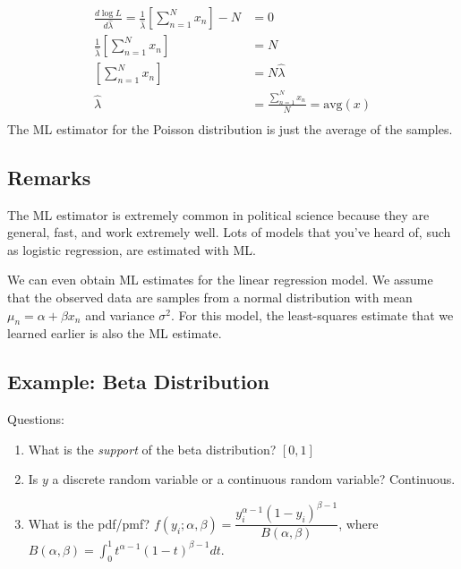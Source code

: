 \documentclass[
]{book}
\providecommand{\tightlist}{%
  \setlength{\itemsep}{0pt}\setlength{\parskip}{0pt}}
\begin{document}
\[
\begin{aligned}
\frac{d \log L}{d\hat{\lambda}} = \frac{1}{\hat{\lambda}} \left[ \sum_{n = 1}^N x_n \right] - N &= 0\\
\frac{1}{\hat{\lambda}} \left[ \sum_{n = 1}^N x_n \right] &= N \\
\left[ \sum_{n = 1}^N x_n \right] &= N \hat{\lambda} \\
\hat{\lambda} &= \frac{ \sum_{n = 1}^N x_n }{N} = \text{avg}(x)  \\
\end{aligned}
\] The ML estimator for the Poisson distribution is just the average of
the samples.

\hypertarget{remarks}{%
\subsection{Remarks}\label{remarks}}

The ML estimator is extremely common in political science because they
are general, fast, and work extremely well. Lots of models that you've
heard of, such as logistic regression, are estimated with ML.

We can even obtain ML estimates for the linear regression model. We
assume that the observed data are samples from a normal distribution
with mean \(\mu_n = \alpha + \beta x_n\) and variance \(\sigma^2\). For
this model, the least-squares estimate that we learned earlier is also
the ML estimate.

\hypertarget{example-beta-distribution}{%
\subsection{Example: Beta
Distribution}\label{example-beta-distribution}}

Questions:

\begin{enumerate}
\def\labelenumi{\arabic{enumi}.}
\tightlist
\item
  What is the \textit{support} of the beta distribution? \([0, 1]\)
\item
  Is \(y\) a discrete random variable or a continuous random variable?
  Continuous.
\item
  What is the pdf/pmf?
  \(f(y_i; \alpha, \beta) = \dfrac{y_i^{\alpha - 1}(1 - y_i)^{\beta - 1}}{B(\alpha, \beta)}\),
  where
  \(B(\alpha, \beta) = \displaystyle \int_0^1 t^{\alpha - 1}(1 - t)^{\beta - 1}dt\).
\end{enumerate}
\end{document}
